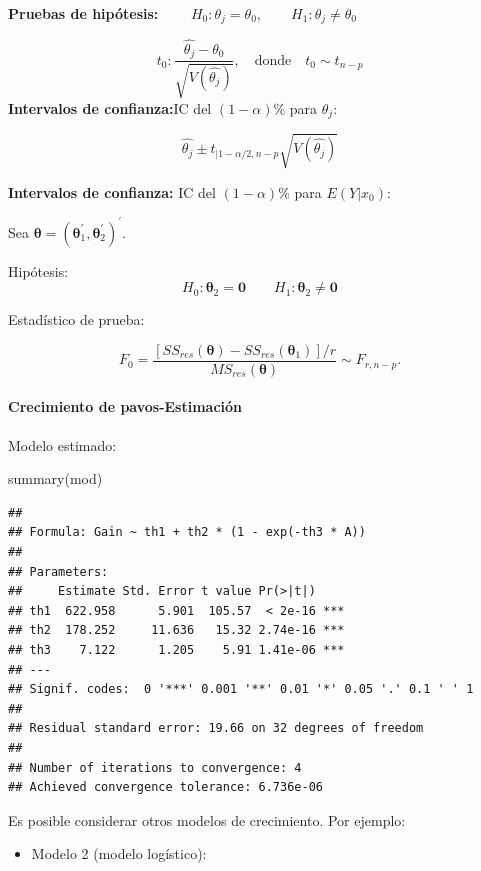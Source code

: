 \documentclass[
]{article}
\newenvironment{Shaded}{\begin{snugshade}}{\end{snugshade}}
\newcommand{\FunctionTok}[1]{\textcolor[rgb]{0.00,0.00,0.00}{#1}}
\newcommand{\NormalTok}[1]{#1}
\providecommand{\tightlist}{%
  \setlength{\itemsep}{0pt}\setlength{\parskip}{0pt}}
\begin{document}
\textbf{Pruebas de hipótesis:} \(\qquad H_{0}:\theta_{j}=\theta_{0}, \qquad H_{1}:\theta_{j}\ne\theta_{0}\)

\[
t_{0}:\frac{\hat{\theta_{j}}-\theta_{0}}{\sqrt{V(\hat{\theta_{j}})}}, \quad \text{donde} \quad t_{0} \sim t_{n-p}
\]
\textbf{Intervalos de confianza:}IC del \((1-\alpha)\)\% para \(\theta_{j}\):

\[
\hat{\theta_{j}}\pm t_{|1-\alpha/2,n-p}\sqrt{V(\hat{\theta_{j}})} 
\]

\textbf{Intervalos de confianza:} IC del \((1-\alpha)\)\% para \(E(Y|x_{0})\):

Sea \(\boldsymbol \theta=(\boldsymbol \theta_{1}^{'},\boldsymbol \theta_{2}^{'})^{'}.\)

Hipótesis:
\[
H_{0}:\boldsymbol \theta_{2}=\boldsymbol 0\qquad H_{1}:\boldsymbol \theta_{2}\ne\boldsymbol 0
\]

Estadístico de prueba:

\[
F_{0}=\frac{[SS_{res}(\boldsymbol \theta)-SS_{res}(\boldsymbol \theta_{1})]/r}{MS_{res}(\boldsymbol \theta)}\sim F_{r,n-p}.
\]

\hypertarget{crecimiento-de-pavos-estimaciuxf3n}{%
\paragraph{Crecimiento de pavos-Estimación}\label{crecimiento-de-pavos-estimaciuxf3n}}

Modelo estimado:

\begin{Shaded}
\begin{Highlighting}[]
\FunctionTok{summary}\NormalTok{(mod)}
\end{Highlighting}
\end{Shaded}

\begin{verbatim}
## 
## Formula: Gain ~ th1 + th2 * (1 - exp(-th3 * A))
## 
## Parameters:
##     Estimate Std. Error t value Pr(>|t|)    
## th1  622.958      5.901  105.57  < 2e-16 ***
## th2  178.252     11.636   15.32 2.74e-16 ***
## th3    7.122      1.205    5.91 1.41e-06 ***
## ---
## Signif. codes:  0 '***' 0.001 '**' 0.01 '*' 0.05 '.' 0.1 ' ' 1
## 
## Residual standard error: 19.66 on 32 degrees of freedom
## 
## Number of iterations to convergence: 4 
## Achieved convergence tolerance: 6.736e-06
\end{verbatim}

Es posible considerar otros modelos de crecimiento. Por ejemplo:

\begin{itemize}
\tightlist
\item
  Modelo 2 (modelo logístico):
\end{itemize}
\end{document}
